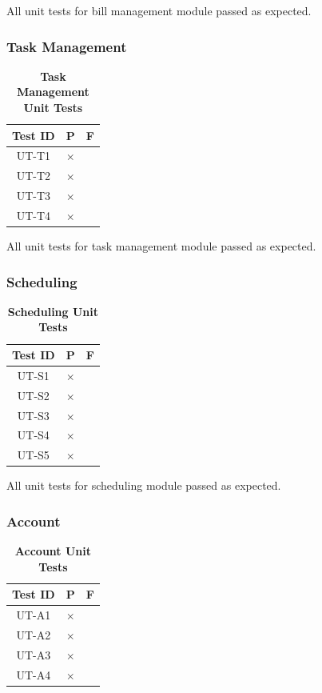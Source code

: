 \documentclass[12pt, titlepage]{article}
\begin{document}
All unit tests for bill management module passed as expected.

\subsubsection{Task Management}

\begin{table}[H]
\centering
\begin{tabular}{|c|c|c|}
\hline
Test ID & P & F\\
\hline 
UT-T1 & $\times$ & \\
UT-T2 & $\times$ & \\
UT-T3 & $\times$ & \\
UT-T4 & $\times$ & \\
\hline
\end{tabular}
\caption{\bf Task Management Unit Tests}
\end{table}

All unit tests for task management module passed as expected.

\subsubsection{Scheduling}

\begin{table}[H]
\centering
\begin{tabular}{|c|c|c|}
\hline
Test ID & P & F\\
\hline 
UT-S1 & $\times$ & \\
UT-S2 & $\times$ & \\
UT-S3 & $\times$ & \\
UT-S4 & $\times$ & \\
UT-S5 & $\times$ & \\
\hline
\end{tabular}
\caption{\bf Scheduling Unit Tests}
\end{table}

All unit tests for scheduling module passed as expected.

\subsubsection{Account}

\begin{table}[H]
\centering
\begin{tabular}{|c|c|c|}
\hline
Test ID & P & F\\
\hline 
UT-A1 & $\times$ & \\
UT-A2 & $\times$ & \\
UT-A3 & $\times$ & \\
UT-A4 & $\times$ & \\
\hline
\end{tabular}
\caption{\bf Account Unit Tests}
\end{table}
\end{document}
